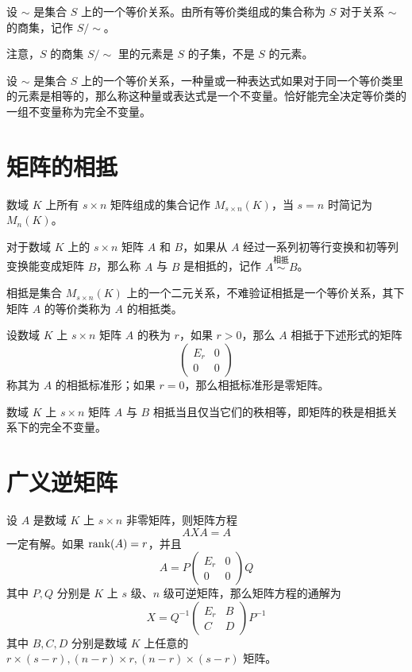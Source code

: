 \begin{definition}
    设 $\sim$ 是集合 $S$ 上的一个等价关系。由所有等价类组成的集合称为 $S$ 对于关系 $\sim$ 的商集，记作 $S/\sim$。
\end{definition}

注意，$S$ 的商集 $S/\sim$ 里的元素是 $S$ 的子集，不是 $S$ 的元素。

设 $\sim$ 是集合 $S$ 上的一个等价关系，一种量或一种表达式如果对于同一个等价类里的元素是相等的，那么称这种量或表达式是一个不变量。恰好能完全决定等价类的一组不变量称为完全不变量。

\section{矩阵的相抵}

数域 $K$ 上所有 $s\times n$ 矩阵组成的集合记作 $M_{s\times n}(K)$，当 $s=n$ 时简记为 $M_n(K)$。

\begin{definition}
    对于数域 $K$ 上的 $s\times n$ 矩阵 $A$ 和 $B$，如果从 $A$ 经过一系列初等行变换和初等列变换能变成矩阵 $B$，那么称 $A$ 与 $B$ 是相抵的，记作 $A\overset{\text{相抵}}{\sim}B$。
\end{definition}

相抵是集合 $M_{s\times n}(K)$ 上的一个二元关系，不难验证相抵是一个等价关系，其下矩阵 $A$ 的等价类称为 $A$ 的相抵类。

\begin{theorem}
    设数域 $K$ 上 $s\times n$ 矩阵 $A$ 的秩为 $r$，如果 $r>0$，那么 $A$ 相抵于下述形式的矩阵
    \[\left(\begin{matrix}
        E_r & 0\\
        0   & 0
    \end{matrix}\right)\]
    称其为 $A$ 的相抵标准形；如果 $r=0$，那么相抵标准形是零矩阵。
\end{theorem}

\begin{theorem}
    数域 $K$ 上 $s\times n$ 矩阵 $A$ 与 $B$ 相抵当且仅当它们的秩相等，即矩阵的秩是相抵关系下的完全不变量。
\end{theorem}

\section{广义逆矩阵}

\begin{theorem}
    设 $A$ 是数域 $K$ 上 $s\times n$ 非零矩阵，则矩阵方程
    \[AXA = A\]
    一定有解。如果 $\operatorname{rank}(A) = r$，并且
    \[A = P\left(\begin{matrix}
        E_r & 0\\
        0   & 0
    \end{matrix}\right)Q\]
    其中 $P,Q$ 分别是 $K$ 上 $s$ 级、$n$ 级可逆矩阵，那么矩阵方程的通解为
    \[X = Q^{-1}\left(\begin{matrix}
        E_r & B\\
        C   & D
    \end{matrix}\right)P^{-1}\]
    其中 $B,C,D$ 分别是数域 $K$ 上任意的 $r\times (s-r),(n-r)\times r,(n-r)\times (s-r)$ 矩阵。
\end{theorem}

